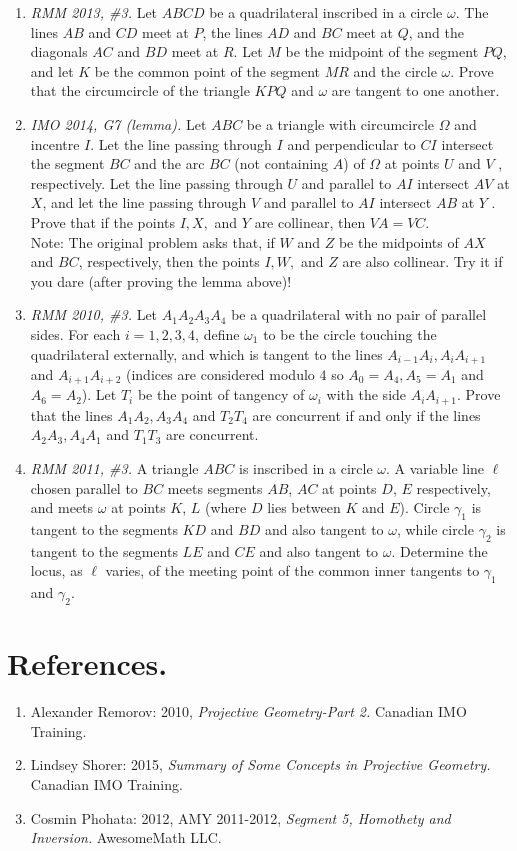 \documentclass[11pt,a4paper]{article}
\begin{document}
\begin {enumerate}
\item\emph {RMM 2013, \#3.} Let $ABCD$ be a quadrilateral inscribed in a circle $\omega$. The lines $AB$ and $CD$ meet at $P$, the lines $AD$ and $BC$ meet at $Q$, and the diagonals $AC$ and $BD$ meet at $R$. Let $M$ be the midpoint of the segment $PQ$, and let $K$ be the common point of the segment $MR$ and the circle $\omega$. Prove that the circumcircle of the triangle $KPQ$ and $\omega$ are tangent to one another.
\item\emph{IMO 2014, G7 (lemma).} Let $ABC$ be a triangle with circumcircle $\Omega$ and incentre $I$. Let the line passing through $I$ and perpendicular to $CI$ intersect the segment $BC$ and the arc $BC$ (not containing $A$) of $\Omega$ at points $U$ and $V$ , respectively. Let the line passing through $U$ and parallel to $AI$ intersect $AV$ at $X$, and let the line passing through $V$ and parallel to $AI$ intersect $AB$ at $Y$ . Prove that if the points $I, X,$ and $Y$ are collinear, then $VA=VC$.
\\Note: The original problem asks that, if $W$ and $Z$ be the midpoints of $AX$ and $BC$, respectively, then the points $I, W ,$ and $Z$ are also collinear. Try it if you dare (after proving the lemma above)!
\item\emph {RMM 2010, \#3.} Let $A_1A_2A_3A_4$ be a quadrilateral with no pair of parallel sides. For each $i=1, 2, 3, 4$, define $\omega_1$ to be the circle touching the quadrilateral externally, and which is tangent to the lines $A_{i-1}A_i, A_iA_{i+1}$ and $A_{i+1}A_{i+2}$ (indices are considered modulo $4$ so $A_0=A_4, A_5=A_1$ and $A_6=A_2$). Let $T_i$ be the point of tangency of $\omega_i$ with the side $A_iA_{i+1}$. Prove that the lines $A_1A_2, A_3A_4$ and $T_2T_4$ are concurrent if and only if the lines $A_2A_3, A_4A_1$ and $T_1T_3$ are concurrent.
\item\emph {RMM 2011, \#3.} A triangle $ABC$ is inscribed in a circle $\omega$.
A variable line $\ell$ chosen parallel to $BC$ meets segments $AB$, $AC$ at points $D$, $E$ respectively, and meets $\omega$ at points $K$, $L$ (where $D$ lies between $K$ and $E$).
Circle $\gamma_1$ is tangent to the segments $KD$ and $BD$ and also tangent to $\omega$, while circle $\gamma_2$ is tangent to the segments $LE$ and $CE$ and also tangent to $\omega$.
Determine the locus, as $\ell$ varies, of the meeting point of the common inner tangents to $\gamma_1$ and $\gamma_2$.
\end {enumerate}

\section {References.}
\begin{enumerate}
\item Alexander Remorov: 2010, \emph {Projective Geometry-Part 2.} Canadian IMO Training.
\item Lindsey Shorer: 2015, \emph {Summary of Some Concepts in Projective Geometry.} Canadian IMO Training.
\item Cosmin Phohata: 2012, AMY 2011-2012, \emph {Segment 5, Homothety and Inversion.} AwesomeMath LLC.
\end{enumerate}
\end{document}
